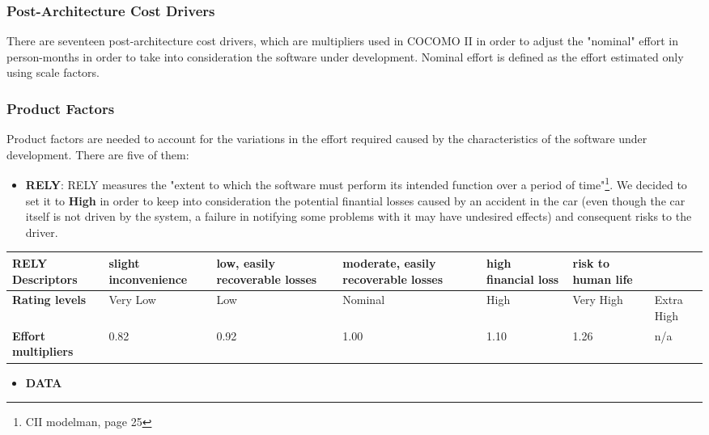 \subsubsection{Post-Architecture Cost Drivers}
There are seventeen post-architecture cost drivers, which are multipliers used in COCOMO II in order to adjust the "nominal" effort in person-months in order to take into consideration the software under development. Nominal effort is defined as the effort estimated only using scale factors. 

	\subsubsection*{Product Factors}
	Product factors are needed to account for the variations in the effort required caused by the characteristics of the software under development. There are five of them:
	
		\begin{itemize}
			\item \textbf{RELY}: RELY measures the "extent to which the software must perform its intended
function over a period of time"\footnote{CII modelman, page 25}. We decided to set it to \textbf{High} in order to keep into consideration the potential finantial losses caused by an accident in the car (even though the car itself is not driven by the system, a failure in notifying some problems with it may have undesired effects) and consequent risks to the driver. 
		\end{itemize}
		
		\begin{center}
			\begin{tabular}{ | C{2cm} | C{2cm} | C{2cm} | C{2cm} | C{2cm} | C{2cm} | C{2cm} | }
				\hline
				\textbf{RELY Descriptors} & slight inconvenience & low, easily recoverable losses & moderate, easily recoverable losses & high financial loss & risk to human life & \\ \hline
			
				\textbf{Rating levels} & Very Low & Low & Nominal & High & Very High & Extra High\\ \hline
			
				\textbf{Effort multipliers} & 0.82 & 0.92 & 1.00 & 1.10 & 1.26 & n/a\\ \hline
			\end{tabular}
		\end{center}
		
		
		\begin{itemize}
			\item \textbf{DATA} %
		\end{itemize}
		
